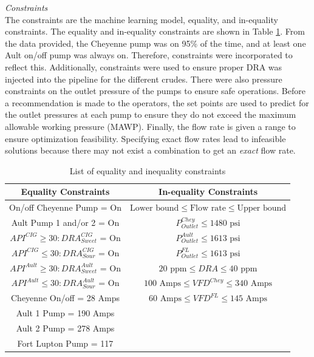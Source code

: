 \noindent
\textit{Constraints} \\
The constraints are the machine learning model, equality, and in-equality constraints.  The equality and in-equality constraints are shown in Table \ref{tab:08eq_neq_constraints}. From the data provided, the Cheyenne pump was on 95\% of the time, and at least one Ault on/off pump was always on. Therefore, constraints were incorporated to reflect this.  Additionally, constraints were used to ensure proper DRA was injected into the pipeline for the different crudes.  There were also pressure constraints on the outlet pressure of the pumps to ensure safe operations.  Before a recommendation is made to the operators, the set points are used to predict for the outlet pressures at each pump to ensure they do not exceed the maximum allowable working pressure (MAWP). Finally, the flow rate is given a range to ensure optimization feasibility. Specifying exact flow rates lead to infeasible solutions because there may not exist a combination to get an \textit{exact} flow rate.

\begin{table}[h]
    \centering
    {
    \begin{tabular}{c|c}
         Equality Constraints              & In-equality Constraints \\
         \hline
         On/off Cheyenne Pump = On         & $\text{Lower bound} \leq \text{Flow rate} \leq \text{Upper bound}$ \\
         
         Ault Pump 1 and/or 2 = On          & $P_{Outlet}^{Chey} \leq 1480 \text{ psi}$       \\
         
         $API^{CIG} \geq 30: DRA_{Sweet}^{CIG}$ = On & $P_{Outlet}^{Ault} \leq 1613 \text{ psi}$ \\
         
         $API^{CIG} \leq 30: DRA_{Sour}^{CIG}$ = On  & $P_{Outlet}^{FL} \leq 1613 \text{ psi}$  \\
         
         $API^{Ault} \geq 30: DRA_{Sweet}^{Ault}$ = On & $20 \text{ ppm} \leq DRA \leq 40 \text{ ppm}$                 \\
         
         $API^{Ault} \leq 30: DRA_{Sour}^{Ault}$  = On  & $100 \text{ Amps} \leq VFD^{Chey} \leq 340 \text{ Amps}$   \\
         
         Cheyenne On/off = 28 Amps  & $60 \text{ Amps} \leq VFD^{FL} \leq 145 \text{ Amps}$  \\
         Ault 1 Pump = 190 Amps & \\
         Ault 2 Pump = 278 Amps & \\
         Fort Lupton Pump = 117 & \\
    \end{tabular}}   
    \caption{List of equality and inequality constraints}
    \label{tab:08eq_neq_constraints}
\end{table}

